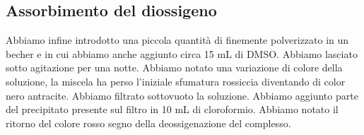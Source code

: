 \subsection{Assorbimento del diossigeno}
Abbiamo infine introdotto una piccola quantità di  finemente polverizzato in un becher e in cui abbiamo anche aggiunto circa 15 mL di DMSO. Abbiamo lasciato sotto agitazione per una notte. Abbiamo notato una variazione di colore della soluzione, la miscela ha perso l'iniziale sfumatura rossiccia diventando di color nero antracite. Abbiamo filtrato sottovuoto la soluzione. Abbiamo aggiunto parte del precipitato presente sul filtro in 10 mL di cloroformio. Abbiamo notato il ritorno del colore rosso segno della deossigenazione del complesso.

